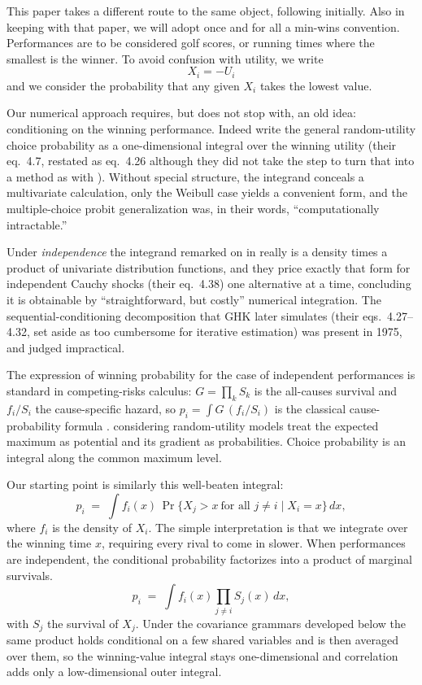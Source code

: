 \documentclass[11pt]{article}
\begin{document}
This paper takes a different route to the same object, following \citet{cotton2021} initially. Also in keeping with that paper, we will adopt once and for all a min-wins
convention. Performances are to be considered golf scores, or running times where the smallest is the winner. To avoid confusion with utility, we write
$$X_i=-U_i$$
and we consider the probability that any given $X_i$ takes the lowest value.

Our numerical approach requires, but does not stop with, an old idea: conditioning on the winning performance. Indeed \citet{domencich1975} write the general random-utility choice probability as a one-dimensional integral over the winning utility
(their eq.~4.7, restated as eq.~4.26 although they did not take the step to turn that into a method as with \citet{cotton2021}). Without special structure, the integrand conceals a multivariate calculation, only the Weibull case yields a convenient form, and the multiple-choice probit generalization
was, in their words, ``computationally intractable.''

Under \emph{independence} the integrand remarked on in \citet{domencich1975} really is a density times a product of univariate distribution functions, and they price exactly that form for independent Cauchy shocks (their eq.~4.38) one alternative at a
time, concluding it is obtainable by ``straightforward, but costly''
numerical integration. The sequential-conditioning
decomposition that GHK later simulates (their eqs.~4.27--4.32, set aside
as too cumbersome for iterative estimation) was present in 1975,
and judged impractical.

The expression of winning probability for the case of independent performances is standard in competing-risks
calculus: $G=\prod_k S_k$ is the all-causes survival and $f_i/S_i$ the
cause-specific hazard, so $p_i=\int G\,(f_i/S_i)$ is the classical
cause-probability formula \citep{kalbfleisch2002}.
\citet{fosgerau2013} considering random-utility models treat the expected maximum as potential  and its gradient as probabilities. Choice probability is
an integral along the common maximum level.

Our starting point is similarly this well-beaten integral:
\begin{equation}\label{eq:onedim}
p_i \;=\; \int f_i(x)\,
\Pr\{X_j>x\ \text{for all } j\ne i\mid X_i=x\}\,dx,
\end{equation}
where $f_i$ is the density of $X_i$. The simple interpretation is that we integrate over the winning time $x$,
requiring every rival to come in slower. When performances are
independent, the conditional probability factorizes into a product of
marginal survivals.
\begin{equation}\label{eq:field-intro}
p_i \;=\; \int f_i(x)\prod_{j\ne i}S_j(x)\,dx,
\end{equation}
with $S_j$ the survival of $X_j$. Under the covariance grammars developed
below the same product holds conditional on a few shared variables and is
then averaged over them, so the winning-value integral stays
one-dimensional and correlation adds only a low-dimensional outer
integral.
\end{document}

